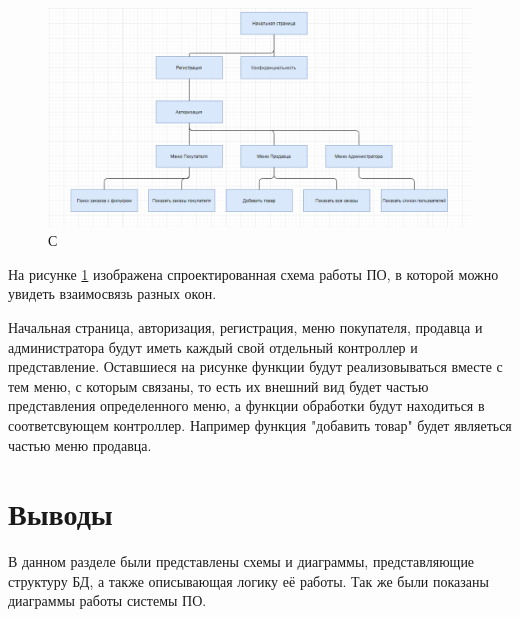 \begin{figure}[ht!]
  \centering
  \includegraphics[scale=0.5]{img/Схема Работы ПО.png}
  \caption{С}
  \label{fig:image21}
\end{figure}

\hspace{0cm} На рисунке \ref{fig:image21} изображена спроектированная схема работы ПО, в которой можно увидеть взаимосвязь разных окон.

\hspace{0cm} Начальная страница, авторизация, регистрация, меню покупателя, продавца и администратора будут иметь каждый свой отдельный контроллер и представление. Оставшиеся на рисунке функции будут реализовываться вместе с тем меню, с которым связаны, то есть их внешний вид будет частью представления определенного меню, а функции обработки будут находиться в соответсвующем контроллер. Например функция "добавить товар" будет являеться частью меню продавца.

\section{Выводы}

\hspace{0cm} В данном разделе были представлены схемы и диаграммы, представляющие структуру БД, а также описывающая логику её работы. Так же были показаны диаграммы работы системы ПО.

